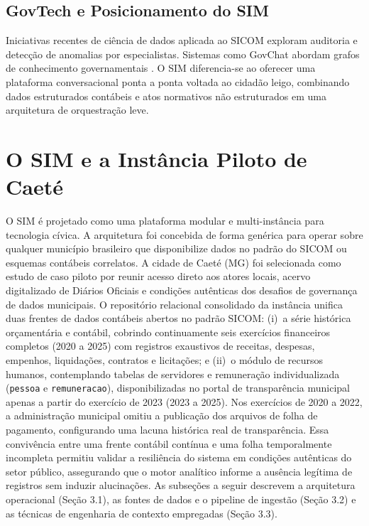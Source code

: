 \documentclass[12pt]{article}
\begin{document}
\subsection{GovTech e Posicionamento do SIM}

Iniciativas recentes de ciência de dados aplicada ao SICOM \cite{Lei2024SICOM} exploram auditoria e detecção de anomalias por especialistas. Sistemas como GovChat abordam grafos de conhecimento governamentais \cite{KatsogiannisMeimaris2023GovChat}. O SIM diferencia-se ao oferecer uma plataforma conversacional ponta a ponta voltada ao cidadão leigo, combinando dados estruturados contábeis e atos normativos não estruturados em uma arquitetura de orquestração leve.

\section{O SIM e a Instância Piloto de Caeté}

O SIM é projetado como uma plataforma modular e multi-instância para tecnologia cívica. A arquitetura foi concebida de forma genérica para operar sobre qualquer município brasileiro que disponibilize dados no padrão do SICOM ou esquemas contábeis correlatos. A cidade de Caeté (MG) foi selecionada como estudo de caso piloto por reunir acesso direto aos atores locais, acervo digitalizado de Diários Oficiais e condições autênticas dos desafios de governança de dados municipais. O repositório relacional consolidado da instância unifica duas frentes de dados contábeis abertos no padrão SICOM: (i)~a série histórica orçamentária e contábil, cobrindo continuamente seis exercícios financeiros completos (2020 a 2025) com registros exaustivos de receitas, despesas, empenhos, liquidações, contratos e licitações; e (ii)~o módulo de recursos humanos, contemplando tabelas de servidores e remuneração individualizada (\texttt{pessoa} e \texttt{remuneracao}), disponibilizadas no portal de transparência municipal apenas a partir do exercício de 2023 (2023 a 2025). Nos exercícios de 2020 a 2022, a administração municipal omitiu a publicação dos arquivos de folha de pagamento, configurando uma lacuna histórica real de transparência. Essa convivência entre uma frente contábil contínua e uma folha temporalmente incompleta permitiu validar a resiliência do sistema em condições autênticas do setor público, assegurando que o motor analítico informe a ausência legítima de registros sem induzir alucinações. As subseções a seguir descrevem a arquitetura operacional (Seção 3.1), as fontes de dados e o pipeline de ingestão (Seção 3.2) e as técnicas de engenharia de contexto empregadas (Seção 3.3).
\end{document}
